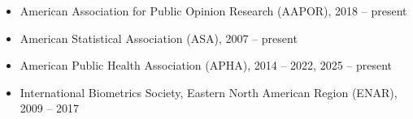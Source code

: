 \documentclass[
  english,
  letterpaper,
  DIV=11,
  numbers=noendperiod]{scrartcl}
\providecommand{\tightlist}{%
  \setlength{\itemsep}{0pt}\setlength{\parskip}{0pt}}
\begin{document}
\begin{itemize}
\tightlist
\item
  American Association for Public Opinion Research (AAPOR), 2018 --
  present
\item
  American Statistical Association (ASA), 2007 -- present
\item
  American Public Health Association (APHA), 2014 -- 2022, 2025 --
  present
\item
  International Biometrics Society, Eastern North American Region
  (ENAR), 2009 -- 2017
\end{itemize}
\end{document}
